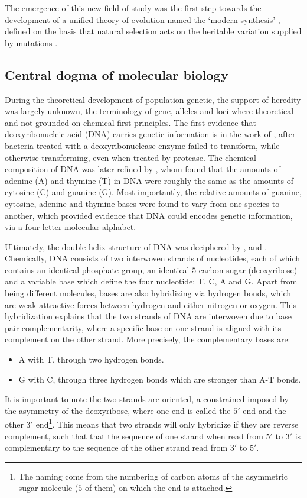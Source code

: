 The emergence of this new field of study was the first step towards the development of a unified theory of evolution named the ‘modern synthesis’ \citep{huxley1942evolution}, defined on the basis that natural selection acts on the heritable variation supplied by mutations \citep{mayr1959where,stebbins1966processes,dobzhansky1974chance}.

\subsection{Central dogma of molecular biology}
During the theoretical development of population-genetic, the support of heredity was largely unknown, the terminology of gene, alleles and loci where theoretical and not grounded on chemical first principles.
The first evidence that deoxyribonucleic acid (\acrshort{DNA}) carries genetic information is in the work of \citet{Avery1944}, after bacteria treated with a deoxyribonuclease enzyme failed to transform, while otherwise transforming, even when treated by protease.
The chemical composition of \acrshort{DNA} was later refined by \citet{Chargaff1950}, whom found that the amounts of adenine (A) and thymine (T) in \acrshort{DNA} were roughly the same as the amounts of cytosine (C) and guanine (G).
Most importantly, the relative amounts of guanine, cytosine, adenine and thymine bases were found to vary from one species to another, which provided evidence that \acrshort{DNA} could encodes genetic information, via a four letter molecular alphabet.

Ultimately, the double-helix structure of \acrshort{DNA} was deciphered by \citet{franklin1953molecular}, \citet{watson1953molecular} and \citet{wilkins1953molecular}.
Chemically, \acrshort{DNA} consists of two interwoven strands of nucleotides, each of which contains an identical phosphate group, an identical $5$-carbon sugar (deoxyribose) and a variable base which define the four nucleotide: T, C, A and G.
Apart from being different molecules, bases are also hybridizing via hydrogen bonds, which are weak attractive forces between hydrogen and either nitrogen or oxygen.
This hybridization explains that the two strands of \acrshort{DNA} are interwoven due to base pair complementarity, where a specific base on one strand is aligned with its complement on the other strand.
More precisely, the complementary bases are:
\begin{itemize}
	\item A with T, through two hydrogen bonds.
	\item G with C, through three hydrogen bonds which are stronger than A-T bonds. 
\end{itemize}
It is important to note the two strands are oriented, a constrained imposed by the asymmetry of the deoxyribose, where one end is called the $5'$ end and the other $3'$ end\footnote{The naming come from the numbering of carbon atoms of the asymmetric sugar molecule ($5$ of them) on which the end is attached.}. 
This means that two strands will only hybridize if they are reverse complement, such that that the sequence of one strand when read from $5'$ to $3'$ is complementary to the sequence of the other strand read from $3'$ to $5'$.

